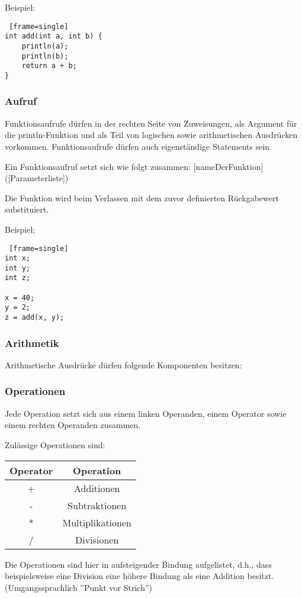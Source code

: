 Beispiel:
\begin{lstlisting} [frame=single] 
int add(int a, int b) {
	println(a);
	println(b);
	return a + b;
}
\end{lstlisting}

\subsubsection{Aufruf}
Funktionsaufrufe dürfen in der rechten Seite von Zuweisungen, als Argument für die println-Funktion und als Teil von logischen sowie arithmetischen Ausdrücken vorkommen. Funktionsaufrufe dürfen auch eigenständige Statements sein.

Ein Funktionsaufruf setzt sich wie folgt zusammen:
[nameDerFunktion]([Parameterliste])

Die Funktion wird beim Verlassen mit dem zuvor definierten Rückgabewert substituiert.

Beispiel;
\begin{lstlisting} [frame=single] 
int x;
int y;
int z;

x = 40;
y = 2;
z = add(x, y);
\end{lstlisting}

\subsubsection{Arithmetik}
Arithmetische Ausdrücke dürfen folgende Komponenten besitzen:

\subsubsection{Operationen}
Jede Operation setzt sich aus einem linken Operanden, einem Operator sowie einem rechten Operanden zusammen.

Zulässige Operationen sind:
\begin{center}
  \begin{tabular}{ | c | c | }
    \hline
    Operator & Operation\\ \hline \hline
    + & Additionen\\ \hline
    - & Subtraktionen\\ \hline
    * & Multiplikationen\\ \hline
    / & Divisionen\\ \hline
  \end{tabular}
\end{center}
Die Operationen sind hier in aufsteigender Bindung aufgelistet, d.h., dass beispielsweise eine Division eine höhere Bindung als eine Addition besitzt. (Umgangssprachlich ''Punkt vor Strich'')

